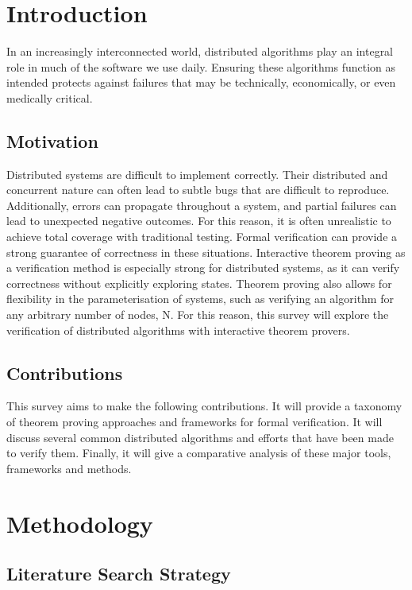 \documentclass[acmsmall,screen,review]{acmart}
\begin{document}
\section{Introduction}

  In an increasingly interconnected world, distributed algorithms play an integral role in much of the software we use daily.
  Ensuring these algorithms function as intended protects against failures that may be technically, economically, or even medically critical.
  
\subsection{Motivation}

  Distributed systems are difficult to implement correctly. 
  Their distributed and concurrent nature can often lead to subtle bugs that are difficult to reproduce.
  Additionally, errors can propagate throughout a system, and partial failures can lead to unexpected negative outcomes.
  For this reason, it is often unrealistic to achieve total coverage with traditional testing.
  Formal verification can provide a strong guarantee of correctness in these situations.
  Interactive theorem proving as a verification method is especially strong for distributed systems, as it can verify correctness without explicitly exploring states.
  Theorem proving also allows for flexibility in the parameterisation of systems, such as verifying an algorithm for any arbitrary number of nodes, N.
  For this reason, this survey will explore the verification of distributed algorithms with interactive theorem provers.

\subsection{Contributions}
  This survey aims to make the following contributions.
  It will provide a taxonomy of theorem proving approaches and frameworks for formal verification.
  It will discuss several common distributed algorithms and efforts that have been made to verify them.
  Finally, it will give a comparative analysis of these major tools, frameworks and methods.

\section{Methodology}

\subsection{Literature Search Strategy}
\end{document}
